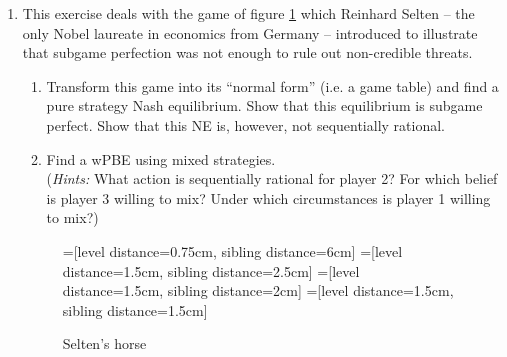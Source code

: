 \documentclass[a4paper,12pt]{article}
\begin{document}
\begin{enumerate}
  \item This exercise deals with the game of figure \ref{fig:selten_ex} which Reinhard Selten -- the only Nobel laureate in economics from Germany -- introduced to illustrate that subgame perfection was not enough to rule out non-credible threats.
    \begin{enumerate}
    \item Transform this game into its ``normal form'' (i.e. a game table) and find a pure strategy Nash equilibrium. Show that this equilibrium is subgame perfect. Show that this NE is, however, not sequentially rational. 
    \item Find a wPBE using mixed strategies.\\ (\emph{Hints:} What action is sequentially rational for player 2? For which belief is player 3 willing to mix? Under which circumstances is player 1 willing to mix?)
    \end{enumerate}
    \begin{figure}[h]
\centering
=[level distance=0.75cm, sibling distance=6cm]
=[level distance=1.5cm, sibling distance=2.5cm]
=[level distance=1.5cm, sibling distance=2cm]
=[level distance=1.5cm, sibling distance=1.5cm]
\caption{Selten's horse}
\label{fig:selten_ex}
\end{figure}


\end{enumerate}
\end{document}
